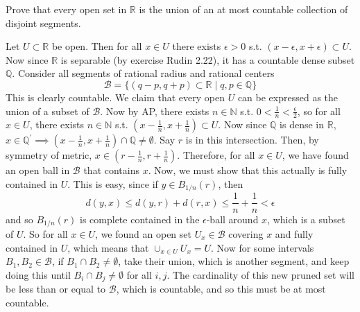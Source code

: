 \documentclass{article}
\begin{document}
    \begin{exercise}[Rudin 2.28]

    \end{exercise}

    \begin{exercise}[Rudin 2.29]
    Prove that every open set in $\mathbb{R}$ is the union of an at most countable collection of disjoint segments. 
    \end{exercise}
    \begin{solution}
      Let $U \subset \mathbb{R}$ be open. Then for all $x \in U$ there exists $\epsilon > 0$ s.t. $(x - \epsilon, x + \epsilon) \subset U$. Now since $\mathbb{R}$ is separable (by exercise Rudin 2.22), it has a countable dense subset $\mathbb{Q}$. Consider all segments of rational radius and rational centers 
      \begin{equation}
        \mathscr{B} = \{ (q - p, q + p) \subset \mathbb{R} \mid q, p \in \mathbb{Q}\}
      \end{equation}
      This is clearly countable. We claim that every open $U$ can be expressed as the union of a subset of $\mathscr{B}$. Now by AP, there exists $n \in \mathbb{N}$ s.t. $0 < \frac{1}{n} < \frac{\epsilon}{2}$, so for all $x \in U$, there exists $n \in \mathbb{N}$ s.t. $(x - \frac{1}{n}, x + \frac{1}{n}) \subset U$. Now since $\mathbb{Q}$ is dense in $\mathbb{R}$, $x \in \mathbb{Q}^\prime \implies (x - \frac{1}{n}, x + \frac{1}{n}) \cap \mathbb{Q} \neq \emptyset$. Say $r$ is in this intersection. Then, by symmetry of metric, $x \in (r - \frac{1}{n}, r + \frac{1}{n})$. Therefore, for all $x \in U$, we have found an open ball in $\mathscr{B}$ that contains $x$. Now, we must show that this actually is fully contained in $U$. This is easy, since if $y \in B_{1/n} (r)$, then 
      \begin{equation}
        d(y, x) \leq d(y, r) + d(r, x) \leq \frac{1}{n} + \frac{1}{n} < \epsilon
      \end{equation}
      and so $B_{1/n} (r)$ is complete contained in the $\epsilon$-ball around $x$, which is a subset of $U$. So for all $x \in U$, we found an open set $U_x \in \mathscr{B}$ covering $x$ and fully contained in $U$, which means that $\cup_{x \in U} U_x = U$. Now for some intervals $B_1, B_2 \in \mathscr{B}$, if $B_1 \cap B_2 \neq \emptyset$, take their union, which is another segment, and keep doing this until $B_i \cap B_j \neq \emptyset$ for all $i, j$. The cardinality of this new pruned set will be less than or equal to $\mathscr{B}$, which is countable, and so this must be at most countable. 
    \end{solution}
\end{document}

